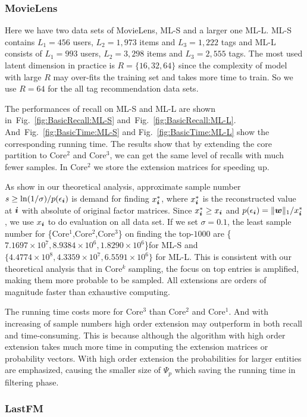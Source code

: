 \documentclass[10pt,journal,compsoc]{IEEEtran}
\newcommand{\V}[1]{{\boldsymbol{{\MakeLowercase{#1}}}}}
\newcommand{\norm}[2]{\|#1\|_{#2}}
\newcommand{\Fig}[1]{Fig.~\ref{fig:#1}}
\begin{document}
\subsubsection{MovieLens}
Here we have two data sets of MovieLens, ML-S and a larger one ML-L. ML-S contains $L_1 = 456$ users, $L_2 = 1,973$ items and $L_3 = 1,222$ tags and ML-L consists of $L_1 = 993$ users, $L_2 = 3,298$ items and $L_3 = 2,555$ tags. The most used latent dimension in practice is $R=\{16,32,64\}$ since the complexity of model with large $R$ may over-fits the training set and takes more time to train. So we use $R=64$ for the all tag recommendation data sets.

The performances of recall on ML-S and ML-L are shown in~\Fig{BasicRecall:ML-S} and~\Fig{BasicRecall:ML-L}. And~\Fig{BasicTime:ML-S} and \Fig{BasicTime:ML-L} show the corresponding running time. The results show that by extending the core partition to Core$^2$ and Core$^3$, we can get the same level of recalls with much fewer samples. In Core$^2$ we store the extension matrices for speeding up.

As show in our theoretical analysis, approximate sample number $s\geq\ln(1/\sigma)/p(\epsilon_{\V{i}})$ is demand for finding $x_\V{i}^*$, where $x_\V{i}^*$ is the reconstructed value at $\V{i}$ with absolute of original factor matrices. Since $x_\V{i}^*\geq x_\V{i}$ and $p(\epsilon_{\V{i}})=\norm{\V{w}}{1}/x_\V{i}^*$, we use $x_\V{i}$ to do evaluation on all data set. If we set $\sigma=0.1$, the least sample number for \{Core$^1$,Core$^2$,Core$^3$\} on finding the top-$1000$ are \{$7.1697\times10^7,8.9384\times10^6,1.8290\times10^6$\}for ML-S and $\{4.4774\times10^8,4.3359\times10^7,6.5591\times10^6\}$ for ML-L. This is consistent with our theoretical analysis that in Core$^k$ sampling, the focus on top entries is amplified, making them more probable to be sampled. All extensions are orders of magnitude faster than exhaustive computing.

The running time costs more for Core$^3$ than Core$^2$ and Core$^1$. And with increasing of sample numbers high order extension may outperform in both recall and time-consuming. This is because although the algorithm with high order extension takes much more time in computing the extension matrices or probability vectors. With high order extension the probabilities for larger entities are emphasized, causing the smaller size of $\Psi_p$ which saving the running time in filtering phase.

\subsubsection{LastFM}
\end{document}
